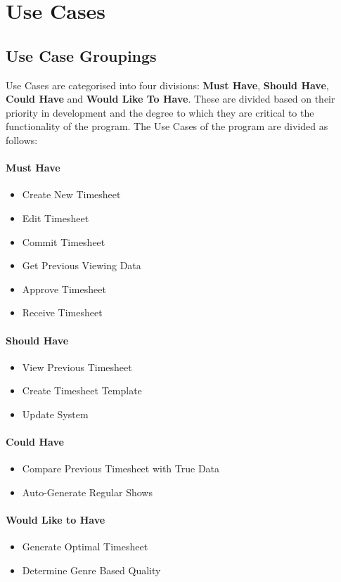 \documentclass[11pt, oneside]{article}
\begin{document}
\section{Use Cases}
\subsection{Use Case Groupings}
Use Cases are categorised into four divisions: \textbf{Must Have}, \textbf{Should Have}, \textbf{Could Have} and \textbf{Would Like To Have}. These are divided based on their priority in development and the degree to which they are critical to the functionality of the program. The Use Cases of the program are divided as follows:
\paragraph{Must Have}
\begin{itemize}
 \item Create New Timesheet
  \item Edit Timesheet
 \item Commit Timesheet
 \item Get Previous Viewing Data
 \item Approve Timesheet
 \item Receive Timesheet
\end{itemize}
\paragraph{Should Have}
\begin{itemize}
 \item View Previous Timesheet
 \item Create Timesheet Template
  \item Update System
\end{itemize}
\paragraph{Could Have}
\begin{itemize}
 \item Compare Previous Timesheet with True Data
 \item Auto-Generate Regular Shows
\end{itemize}
\paragraph{Would Like to Have}
\begin{itemize}
 \item Generate Optimal Timesheet
 \item Determine Genre Based Quality
\end{itemize}
\end{document}
